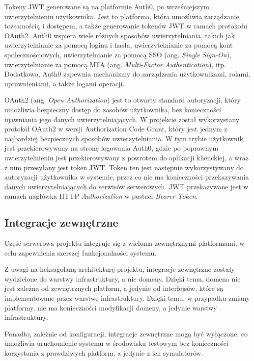 Tokeny JWT generowane są na platformie Auth0, po wcześniejszym uwierzytelnieniu użytkownika. Jest to platforma, która umożliwia zarządzanie tożsamością i dostępem, a także generowanie tokenów JWT w ramach protokołu OAuth2. Auth0 wspiera wiele różnych sposobów uwierzytelniania, takich jak uwierzytelnianie za pomocą loginu i hasła, uwierzytelnianie za pomocą kont społecznościowych, uwierzytelnianie za pomocą SSO (ang. \textit{Single Sign-On}), uwierzytelnianie za pomocą MFA (ang. \textit{Multi-Factor Authentication}), itp. Dodatkowo, Auth0 zapewnia mechanizmy do zarządzania użytkownikami, rolami, uprawnieniami, a także logami operacji.

OAuth2 (ang. \textit{Open Authorization}) jest to otwarty standard autoryzacji, który umożliwia bezpieczny dostęp do zasobów użytkownika, bez konieczności ujawniania jego danych uwierzytelniających. W projekcie został wykorzystany protokół OAuth2 w wersji Authorization Code Grant, który jest jednym z najbardziej bezpiecznych sposobów uwierzytelniania. W tym trybie użytkownik jest przekierowywany na stronę logowania Auth0, gdzie po poprawnym uwierzytelnieniu jest przekierowywany z powrotem do aplikacji klienckiej, a wraz z nim przesyłany jest token JWT. Token ten jest następnie wykorzystywany do autoryzacji użytkownika w systemie, przez co nie ma konieczności przekazywania danych uwierzytelniających do serwisów serwerowych. JWT przekazywane jest w ramach nagłówka HTTP \textit{Authorization} w postaci \textit{Bearer Token}.

\subsection{Integracje zewnętrzne}

Część serwerowa projektu integruje się z wieloma zewnętrznymi platformami, w celu zapewnienia szerszej funkcjonalności systemu. 

Z uwagi na heksagolaną architekturę projektu, integracje zewnętrzne zostały wydzielone do warstwy infrastruktury, a nie domeny. Dzięki temu, domena nie jest zależna od zewnętrznych platform, a jedynie od interfejsów, które są implementowane przez warstwę infrastruktury. Dzięki temu, w przypadku zmiany platformy, nie ma konieczności modyfikacji domeny, a jedynie warstwy infrastruktury. 

Ponadto, zależnie od konfiguracji, integracje zewnętrzne mogą być wyłączone, co umożliwia uruchomienie systemu w środowisku testowym bez konieczności korzystania z prawdziwych platform, a jedynie z ich symulatorów.


